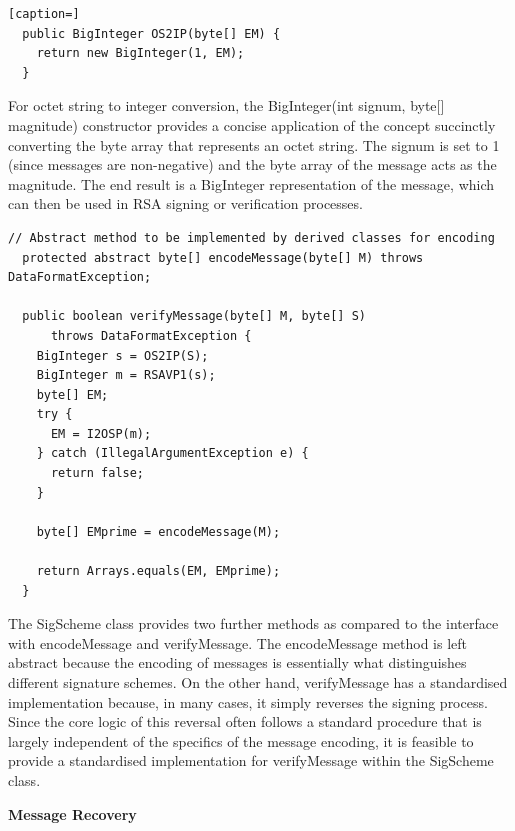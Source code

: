 \documentclass[]{final_report}
\theoremstyle{definition}
\begin{document}
\begin{lstlisting}[caption=]
  public BigInteger OS2IP(byte[] EM) {
    return new BigInteger(1, EM);
  }
 \end{lstlisting}
For octet string to integer conversion, the BigInteger(int signum, byte[] magnitude) constructor provides a concise application of the concept succinctly converting the byte array that represents an octet string. The signum is set to 1 (since messages are non-negative) and the byte array of the message acts as the magnitude. The end result is a BigInteger representation of the message, which can then be used in RSA signing or verification processes.

 

\begin{lstlisting}[caption=Signature Scheme specialisation methods]
  // Abstract method to be implemented by derived classes for encoding
  protected abstract byte[] encodeMessage(byte[] M) throws DataFormatException;

  public boolean verifyMessage(byte[] M, byte[] S)
      throws DataFormatException {
    BigInteger s = OS2IP(S);
    BigInteger m = RSAVP1(s);
    byte[] EM;
    try {
      EM = I2OSP(m);
    } catch (IllegalArgumentException e) {
      return false;
    }

    byte[] EMprime = encodeMessage(M);

    return Arrays.equals(EM, EMprime);
  }
 \end{lstlisting}
 
The SigScheme class provides two further methods as compared to the interface with encodeMessage and verifyMessage. The encodeMessage method is left abstract because the encoding of messages is essentially what distinguishes different signature schemes. On the other hand, verifyMessage has a standardised implementation because, in many cases, it simply reverses the signing process. Since the core logic of this reversal often follows a standard procedure that is largely independent of the specifics of the message encoding, it is feasible to provide a standardised implementation for verifyMessage within the SigScheme class.

\textbf{Message Recovery}
\end{document}

